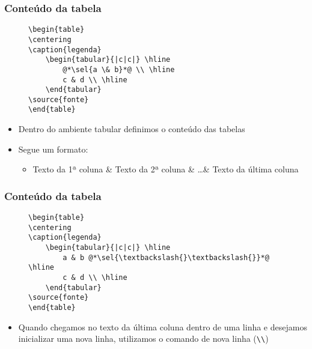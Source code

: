 \begin{frame}[fragile] \frametitle{Conteúdo da tabela}
\begin{figure}[!t]
\begin{lstlisting}
\begin{table}
\centering
\caption{legenda}
	\begin{tabular}{|c|c|} \hline
		@*\sel{a \& b}*@ \\ \hline
		c & d \\ \hline
	\end{tabular}
\source{fonte}
\end{table}
\end{lstlisting}
\end{figure}

\begin{itemize}
	\item Dentro do ambiente tabular definimos o conteúdo das tabelas
	\item Segue um formato:
	\begin{itemize}
		\item Texto da 1ª coluna \& Texto da 2ª coluna \& \ldots \& Texto da última coluna
	\end{itemize}
\end{itemize}
\end{frame}

\begin{frame}[fragile] \frametitle{Conteúdo da tabela}
\begin{figure}[!t]
\begin{lstlisting}
\begin{table}
\centering
\caption{legenda}
	\begin{tabular}{|c|c|} \hline
		a & b @*\sel{\textbackslash{}\textbackslash{}}*@ \hline
		c & d \\ \hline
	\end{tabular}
\source{fonte}
\end{table}
\end{lstlisting}
\end{figure}

\begin{itemize}
	\item Quando chegamos no texto da última coluna dentro de uma linha e desejamos inicializar uma nova linha, utilizamos o comando de nova linha (\texttt{\textbackslash{}\textbackslash{}})
\end{itemize}
\end{frame}

